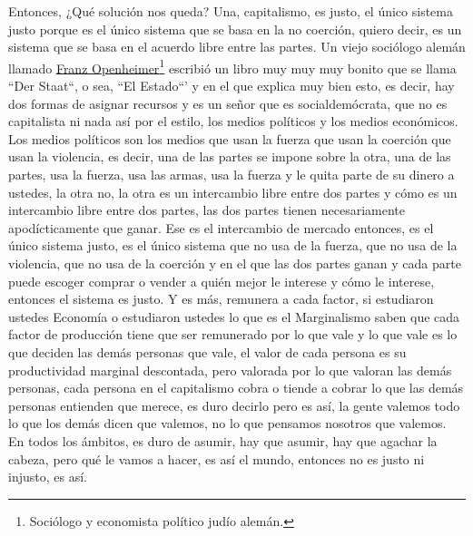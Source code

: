 Entonces, ¿Qué solución nos queda? Una, capitalismo, es justo, el único sistema justo porque es el único sistema que se basa en la no coerción, quiero decir, es un sistema que se basa en el acuerdo libre entre las partes. Un viejo sociólogo alemán llamado \href{https://en.wikipedia.org/wiki/Franz_Oppenheimer}{Franz Openheimer}\footnote{Sociólogo y economista político judío alemán.} escribió un libro muy muy muy bonito que se llama ``Der Staat``\citep{oppenheimer1908state}, o sea, ``El Estado``' y en el que explica muy bien esto, es decir, hay dos formas de asignar recursos y es un señor que es socialdemócrata, que no es capitalista ni nada así por el estilo, los medios políticos y los medios económicos. Los medios políticos son los medios que usan la fuerza que usan la coerción que usan la violencia, es decir, una de las partes se impone sobre la otra, una de las partes, usa la fuerza, usa las armas, usa la fuerza y le quita parte de su dinero a ustedes, la otra no, la otra es un intercambio libre entre dos partes y cómo es un intercambio libre entre dos partes, las dos partes tienen necesariamente apodícticamente que ganar. Ese es el intercambio de mercado entonces, es el único sistema justo, es el único sistema que no usa de la fuerza, que no usa de la violencia, que no usa de la coerción y en el que las dos partes ganan y cada parte puede escoger comprar o vender a quién mejor le interese y cómo le interese, entonces el sistema es justo. Y es más, remunera a cada factor, si estudiaron ustedes Economía o estudiaron ustedes lo que es el Marginalismo saben que cada factor de producción tiene que ser remunerado por lo que vale y lo que vale es lo que deciden las demás personas que vale, el valor de cada persona es su productividad marginal descontada, pero valorada por lo que valoran las demás personas, cada persona en el capitalismo cobra o tiende a cobrar lo que las demás personas entienden que merece, es duro decirlo pero es así, la gente valemos todo lo que los demás dicen que valemos, no lo que pensamos nosotros que valemos. En todos los ámbitos, es duro de asumir, hay que asumir, hay que agachar la cabeza, pero qué le vamos a hacer, es así el mundo, entonces no es justo ni injusto, es así.

